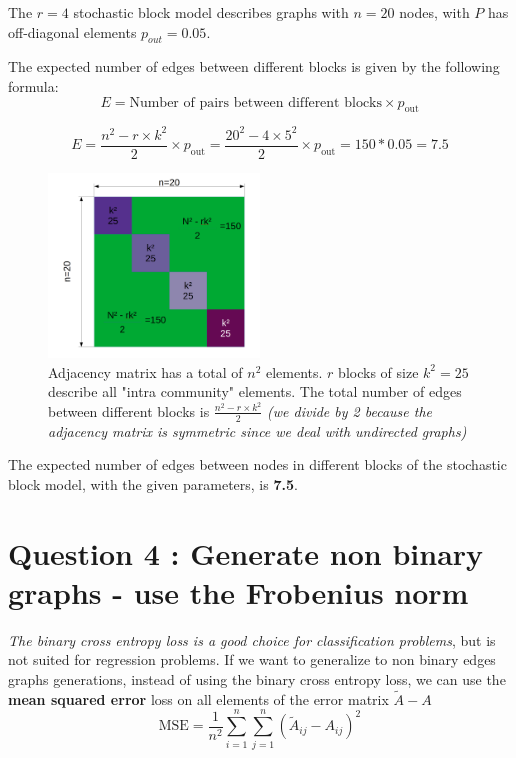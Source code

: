 \documentclass[a4paper]{article}
\begin{document}
The $r=4$ stochastic block model describes graphs with $n=20$ nodes, with $P$ has off-diagonal elements $p_{out}=0.05$.

The expected number of edges between different blocks is given by the following formula:
$$ E = \text{Number of pairs between different blocks} \times p_{\text{out}}$$

$$ E = \frac{n^2 - r \times k^2}{2} \times p_{\text{out}} = \frac{20^2 - 4 \times 5^2}{2}\times p_{\text{out}}=150*0.05=7.5$$

\begin{figure}[H]
    \centering
    \includegraphics[width=0.5\textwidth]{figures/SBM_computation.png}
    \caption{Adjacency matrix has a total of $n^2$ elements. \color{purple}$r$ blocks of size $k^2 = 25$ describe all "intra community" elements. \color{black} The total number of edges between different blocks is \color{green}$\frac{n^2 - r \times k^2}{2}$ \color{black}\textit{(we divide by 2 because the adjacency matrix is symmetric since we deal with undirected graphs)}
    }
    \label{fig:number_of_edges_different_blocks}
\end{figure}

The expected number of edges between nodes in different blocks of the stochastic block model, with the given parameters, is \textbf{7.5}.



\section*{Question 4 : Generate non binary graphs - use the Frobenius norm}
\textit{The binary cross entropy loss is a good choice for classification problems}, but is not suited for regression problems.
If we want to generalize to non binary edges graphs generations, instead of using the binary cross entropy loss, we can use the \textbf{mean squared error} loss on all elements of the error matrix $\tilde{A}-A$ 
$$\text{MSE} = \frac{1}{n^2} \sum_{i=1}^n \sum_{j=1}^n (\tilde{A}_{ij} - A_{ij})^2$$
\end{document}
